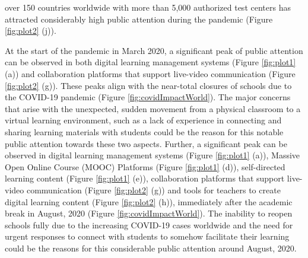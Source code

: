 \documentclass[11pt,a4paper,]{article}
\begin{document}
over 150 countries worldwide with more than 5,000 authorized test centers has attracted considerably high public attention during the pandemic (Figure \ref{fig:plot2} (j)).

At the start of the pandemic in March 2020, a significant peak of public attention can be observed in both digital learning management systems (Figure \ref{fig:plot1} (a)) and collaboration platforms that support live-video communication (Figure \ref{fig:plot2} (g)). These peaks align with the near-total closures of schools due to the COVID-19 pandemic (Figure \ref{fig:covidImpactWorld}). The major concerns that arise with the unexpected, sudden movement from a physical classroom to a virtual learning environment, such as a lack of experience in connecting and sharing learning materials with students could be the reason for this notable public attention towards these two aspects. Further, a significant peak can be observed in digital learning management systems (Figure \ref{fig:plot1} (a)), Massive Open Online Course (MOOC) Platforms (Figure \ref{fig:plot1} (d)), self-directed learning content (Figure \ref{fig:plot1} (e)), collaboration platforms that support live-video communication (Figure \ref{fig:plot2} (g)) and tools for teachers to create digital learning content (Figure \ref{fig:plot2} (h)), immediately after the academic break in August, 2020 (Figure \ref{fig:covidImpactWorld}). The inability to reopen schools fully due to the increasing COVID-19 cases worldwide and the need for urgent responses to connect with students to somehow facilitate their learning could be the reasons for this considerable public attention around August, 2020.
\end{document}
